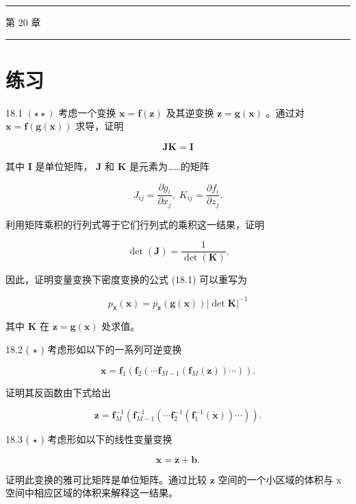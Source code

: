 \documentclass[10pt]{report}
\newcommand{\HRule}{\begin{center}\rule{0.9\linewidth}{0.2mm}\end{center}}
\begin{document}
\HRule

第 20 章

\HRule

\section*{练习}

18.1 \(\left( {\star  \star  }\right)\) 考虑一个变换 \(\mathbf{x} = \mathbf{f}\left( \mathbf{z}\right)\) 及其逆变换 \(\mathbf{z} = \mathbf{g}\left( \mathbf{x}\right)\) 。通过对 \(\mathbf{x} = \mathbf{f}\left( {\mathbf{g}\left( \mathbf{x}\right) }\right)\) 求导，证明

\[
\mathbf{{JK}} = \mathbf{I} \tag{18.31}
\]

其中 \(\mathbf{I}\) 是单位矩阵， \(\mathbf{J}\) 和 \(\mathbf{K}\) 是元素为……的矩阵

\[
{J}_{ij} = \frac{\partial {g}_{i}}{\partial {x}_{j}},\;{K}_{ij} = \frac{\partial {f}_{i}}{\partial {z}_{j}}. \tag{18.32}
\]

利用矩阵乘积的行列式等于它们行列式的乘积这一结果，证明

\[
\det \left( \mathbf{J}\right)  = \frac{1}{\det \left( \mathbf{K}\right) }. \tag{18.33}
\]

因此，证明变量变换下密度变换的公式 (18.1) 可以重写为

\[
{p}_{\mathbf{x}}\left( \mathbf{x}\right)  = {p}_{\mathbf{z}}\left( {\mathbf{g}\left( \mathbf{x}\right) }\right) {\left| \det \mathbf{K}\right| }^{-1} \tag{18.34}
\]

其中 \(\mathbf{K}\) 在 \(\mathbf{z} = \mathbf{g}\left( \mathbf{x}\right)\) 处求值。

18.2 ( \(\star\) ) 考虑形如以下的一系列可逆变换

\[
\mathbf{x} = {\mathbf{f}}_{1}\left( {{\mathbf{f}}_{2}\left( {\cdots {\mathbf{f}}_{M - 1}\left( {{\mathbf{f}}_{M}\left( \mathbf{z}\right) }\right) \cdots }\right) }\right) . \tag{18.35}
\]

证明其反函数由下式给出

\[
\mathbf{z} = {\mathbf{f}}_{M}^{-1}\left( {{\mathbf{f}}_{M - 1}^{-1}\left( {\cdots {\mathbf{f}}_{2}^{-1}\left( {{\mathbf{f}}_{1}^{-1}\left( \mathbf{x}\right) }\right) \cdots }\right) }\right) . \tag{18.36}
\]

18.3 ( \(\star\) ) 考虑形如以下的线性变量变换

\[
\mathbf{x} = \mathbf{z} + \mathbf{b}. \tag{18.37}
\]

证明此变换的雅可比矩阵是单位矩阵。通过比较 \(\mathbf{z}\) 空间的一个小区域的体积与 \(\mathrm{x}\) 空间中相应区域的体积来解释这一结果。
\end{document}
